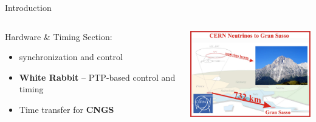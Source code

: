 \documentclass[compress,red]{beamer}
\begin{document}
\begin{frame}{Introduction}

\begin{columns}[c]

     \begin{block}{Hardware \& Timing Section:} 
	\begin{itemize}
	  \item synchronization and control
	  \item \textbf{White Rabbit} -- PTP-based control and timing 
	  \item Time transfer for \textbf{CNGS}
	\end{itemize}
     \end{block}

    \begin{center}
\pause
      \includegraphics[width=6.0cm]{applications/cngs-overview_v3.pdf}
    \end{center}
\end{columns}

\end{frame}
\end{document}
